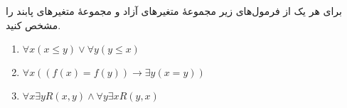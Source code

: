برای هر یک از فرمول‌های زیر مجموعهٔ متغیرهای آزاد و مجموعهٔ متغیرهای پابند را مشخص کنید.
\begin{enumerate}[label=(\alph*)]
  \item $\forall x (x \leq y) \vee \forall y (y \leq x)$
  \item $\forall x ((f(x) = f(y)) \rightarrow \exists y (x = y))$
  \item $\forall x \exists y R(x, y) \wedge \forall y \exists x R(y, x)$
\end{enumerate}